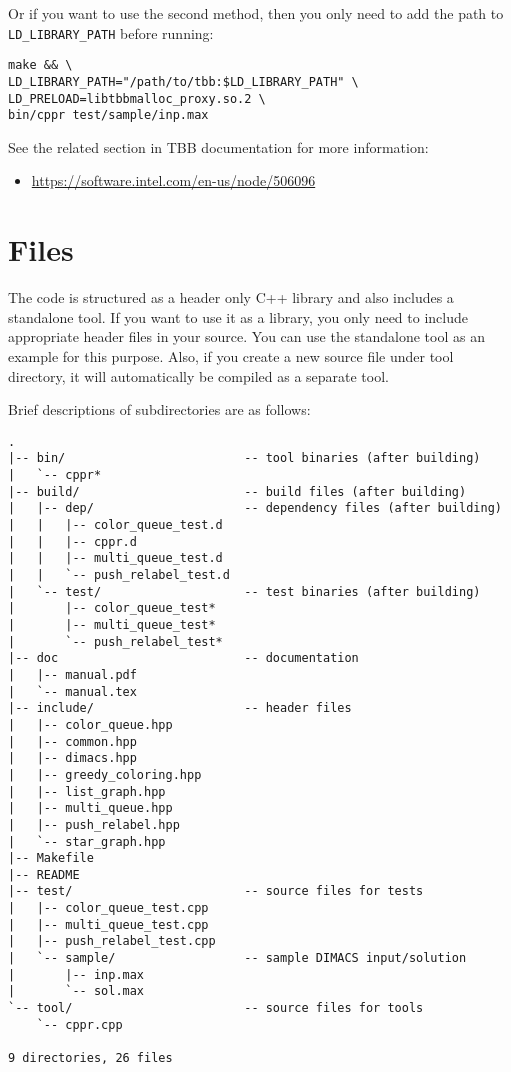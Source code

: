 \documentclass{article}
\begin{document}
Or if you want to use the second method, then you only need to add the path
to \texttt{LD\_LIBRARY\_PATH} before running:

\begin{verbatim}
make && \
LD_LIBRARY_PATH="/path/to/tbb:$LD_LIBRARY_PATH" \
LD_PRELOAD=libtbbmalloc_proxy.so.2 \
bin/cppr test/sample/inp.max
\end{verbatim}

See the related section in TBB documentation for more information:

\begin{itemize}
    \item \url{https://software.intel.com/en-us/node/506096}
\end{itemize}

\section{Files}

The code is structured as a header only C++ library and also includes a
standalone tool. If you want to use it as a library, you only need to
include appropriate header files in your source. You can use the standalone
tool as an example for this purpose. Also, if you create a new source file
under tool directory, it will automatically be compiled as a separate tool.

Brief descriptions of subdirectories are as follows:

\begin{verbatim}
.
|-- bin/                         -- tool binaries (after building)
|   `-- cppr*
|-- build/                       -- build files (after building)
|   |-- dep/                     -- dependency files (after building)
|   |   |-- color_queue_test.d
|   |   |-- cppr.d
|   |   |-- multi_queue_test.d
|   |   `-- push_relabel_test.d
|   `-- test/                    -- test binaries (after building)
|       |-- color_queue_test*
|       |-- multi_queue_test*
|       `-- push_relabel_test*
|-- doc                          -- documentation
|   |-- manual.pdf
|   `-- manual.tex
|-- include/                     -- header files
|   |-- color_queue.hpp
|   |-- common.hpp
|   |-- dimacs.hpp
|   |-- greedy_coloring.hpp
|   |-- list_graph.hpp
|   |-- multi_queue.hpp
|   |-- push_relabel.hpp
|   `-- star_graph.hpp
|-- Makefile
|-- README
|-- test/                        -- source files for tests
|   |-- color_queue_test.cpp
|   |-- multi_queue_test.cpp
|   |-- push_relabel_test.cpp
|   `-- sample/                  -- sample DIMACS input/solution
|       |-- inp.max
|       `-- sol.max
`-- tool/                        -- source files for tools
    `-- cppr.cpp

9 directories, 26 files
\end{verbatim}
\end{document}
